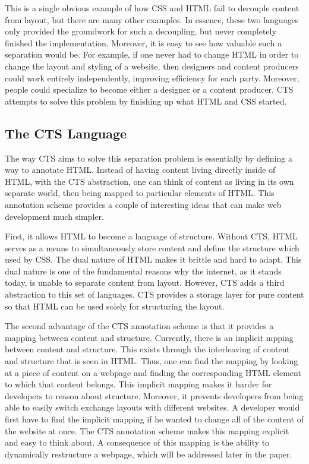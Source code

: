 \documentclass[12pt]{article}
\begin{document}
This is a single obvious example of how CSS and HTML fail to decouple content from layout, but there are many other examples. In essence, these two languages only provided the groundwork for such a decoupling, but never completely finished the implementation. Moreover, it is easy to see how valuable such a separation would be. For example, if one never had to change HTML in order to change the layout and styling of a website, then designers and content producers could work entirely independently, improving efficiency for each party. Moreover, people could specialize to become either a designer or a content producer. CTS attempts to solve this problem by finishing up what HTML and CSS started.

\subsection{The CTS Language}

The way CTS aims to solve this separation problem is essentially by defining a way to annotate HTML. Instead of having content living directly inside of HTML, with the CTS abstraction, one can think of content as living in its own separate world, then being mapped to particular elements of HTML. This annotation scheme provides a couple of interesting ideas that can make web development much simpler.

First, it allows HTML to become a language of structure. Without CTS, HTML serves as a means to simultaneously store content and define the structure which used by CSS. The dual nature of HTML makes it brittle and hard to adapt. This dual nature is one of the fundamental reasons why the internet, as it stands today, is unable to separate content from layout. However, CTS adds a third abstraction to this set of languages. CTS provides a storage layer for pure content so that HTML can be used solely for structuring the layout.

The second advantage of the CTS annotation scheme is that it provides a mapping between content and structure. Currently, there is an implicit mpping between content and structure. This exists through the interleaving of content and structure that is seen in HTML. Thus, one can find the mapping by looking at a piece of content on a webpage and finding the corresponding HTML element to which that content belongs. This implicit mapping makes it harder for developers to reason about structure. Moreover, it prevents developers from being able to easily switch exchange layouts with different websites. A developer would first have to find the implicit mapping if he wanted to change all of the content of the website at once. The CTS annotation scheme makes this mapping explicit and easy to think about. A consequence of this mapping is the ability to dynamically restructure a webpage, which will be addressed later in the paper.
\end{document}
